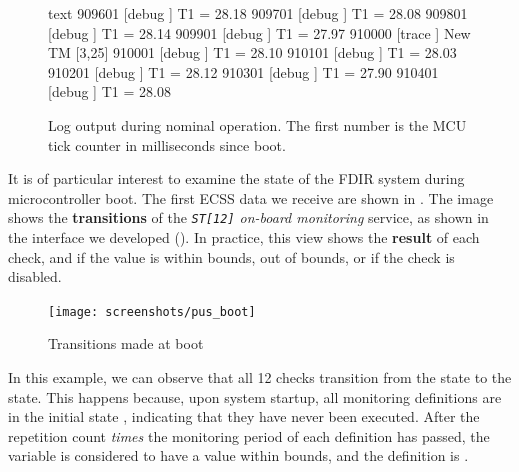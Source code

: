 \documentclass[a4paper,nobib]{tufte-book}
\begin{document}
\begin{figure}
\begin{cminted}{text}
909601  [debug  ] T1 = 28.18
909701  [debug  ] T1 = 28.08
909801  [debug  ] T1 = 28.14
909901  [debug  ] T1 = 27.97
910000  [trace  ] New TM [3,25]
910001  [debug  ] T1 = 28.10
910101  [debug  ] T1 = 28.03
910201  [debug  ] T1 = 28.12
910301  [debug  ] T1 = 27.90
910401  [debug  ] T1 = 28.08
\end{cminted}
\caption[Log output during nominal operation]{Log output during nominal operation. The first number is the \ac{MCU} tick counter in milliseconds since boot.}
\label{fig:lognominal}
\end{figure}


It is of particular interest to examine the state of the \acs{FDIR} system during microcontroller boot. The first \acs{ECSS} data we receive are shown in . The image shows the \textbf{transitions} of the \emph{\texttt{ST[12]} on-board monitoring} service, as shown in the interface we developed (). In practice, this view shows the \textbf{result} of each check, and if the value is within bounds, out of bounds, or if the check is disabled.

\begin{figure}
	\texttt{[image: screenshots/pus\_boot]}
	\caption{Transitions made at boot}
	\label{fig:pus_boot}
\end{figure}

In this example, we can observe that all 12 checks transition from the \unchecked{} state to the \ok{} state. This happens because, upon system startup, all monitoring definitions are in the initial state \unchecked, indicating that they have never been executed. After the repetition count \textsl{times} the monitoring period of each definition has passed, the variable is considered to have a value within bounds, and the definition is \ok.
\end{document}
